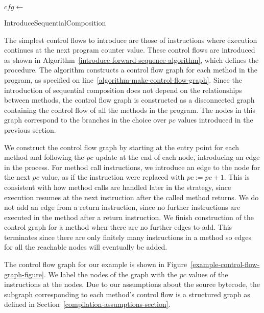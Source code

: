 \begin{algorithm}
  \begin{algorithmic}[1]
    \State $cfg \gets$ 
    \label{algorithm-make-control-flow-graph}
    \label{algorithm-sequence-cfg-loop}
    \label{algorithm-forward-sequence-condition}
    \State {}
    \label{algorithm-forward-sequence-application}
    \EndWhile
    \EndFor
  \end{algorithmic}
  \caption{IntroduceSequentialComposition}
  \label{introduce-forward-sequence-algorithm}
\end{algorithm}
The simplest control flows to introduce are those of instructions
where execution continues at the next program counter value.
These control flows are introduced as shown in
Algorithm~\ref{introduce-forward-sequence-algorithm}, which defines
the  procedure.
The algorithm constructs a control flow graph for each method in the
program, as specified on line~\ref{algorithm-make-control-flow-graph}.
Since the introduction of sequential composition does not depend on
the relationships between methods, the control flow graph is
constructed as a disconnected graph containing the control flow of all
the methods in the program.
The nodes in this graph correspond to the branches in the choice over
$pc$ values introduced in the previous section.

We construct the control flow graph by starting at the entry point for
each method and following the $pc$ update at the end of each node,
introducing an edge in the process.
For method call instructions, we introduce an edge to the node for the
next $pc$ value, as if the instruction were replaced with
$pc := pc + 1$.
This is consistent with how method calls are handled later in the
strategy, since execution resumes at the next instruction after the
called method returns.
We do not add an edge from a return instruction, since no further
instructions are executed in the method after a return instruction.
We finish construction of the control graph for a method when there
are no further edges to add.
This terminates since there are only finitely many instructions in a
method so edges for all the reachable nodes will eventually be added.


The control flow graph for our example is shown in
Figure~\ref{example-control-flow-graph-figure}.
We label the nodes of the graph with the $pc$ values of the
instructions at the nodes.
Due to our assumptions about the source bytecode, the subgraph
corresponding to each method's control flow is a structured graph as
defined in Section~\ref{compilation-assumptions-section}.

